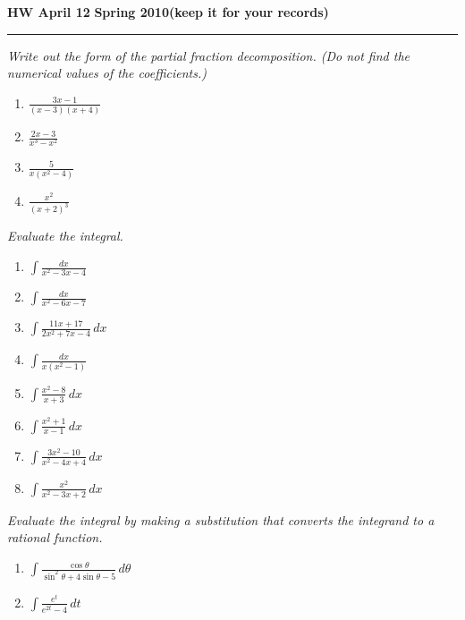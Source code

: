 \documentclass[12pt]{amsart}
\begin{document}
\hfill{\large\bf HW April 12}\hfill{\large\bf
  Spring 2010}\hfill{\large\bf (keep it for your records)}\hrule

\bigskip
{\problem \em Write out the form of the partial fraction
  decomposition.  (Do not find the numerical values of the
  coefficients.)}
\begin{enumerate}
\item $\displaystyle{\frac{3x-1}{(x-3)(x+4)}}$\vspace{0.25cm}
\item $\displaystyle{\frac{2x-3}{x^3-x^2}}$\vspace{0.25cm}
\item $\displaystyle{\frac{5}{x(x^2-4)}}$\vspace{0.25cm}
\item $\displaystyle{\frac{x^2}{(x+2)^3}}$
\end{enumerate}
{\problem \em Evaluate the integral.}
\begin{enumerate}
\item $\displaystyle{\int \frac{dx}{x^2-3x-4}}$\vspace{0.25cm}
\item $\displaystyle{\int \frac{dx}{x^2-6x-7}}$\vspace{0.25cm}
\item $\displaystyle{\int \frac{11x+17}{2x^2+7x-4}\, dx}$\vspace{0.25cm}
\item $\displaystyle{\int \frac{dx}{x(x^2-1)}}$\vspace{0.25cm}
\item $\displaystyle{\int \frac{x^2-8}{x+3}\, dx}$\vspace{0.25cm}
\item $\displaystyle{\int \frac{x^2+1}{x-1}\, dx}$\vspace{0.25cm}
\item $\displaystyle{\int \frac{3x^2-10}{x^2-4x+4}\, dx}$\vspace{0.25cm}
\item $\displaystyle{\int \frac{x^2}{x^2-3x+2}\, dx}$
\end{enumerate}
{\problem \em Evaluate the integral by making a substitution that
  converts the integrand to a rational function.}
\begin{enumerate}
\item $\displaystyle{\int \frac{\cos \theta}{\sin^2\theta +4 \sin
      \theta -5}\, d\theta}$\vspace{0.25cm}
\item $\displaystyle{\int \frac{e^t}{e^{2t}-4}\, dt}$
\end{enumerate}
\end{document}
